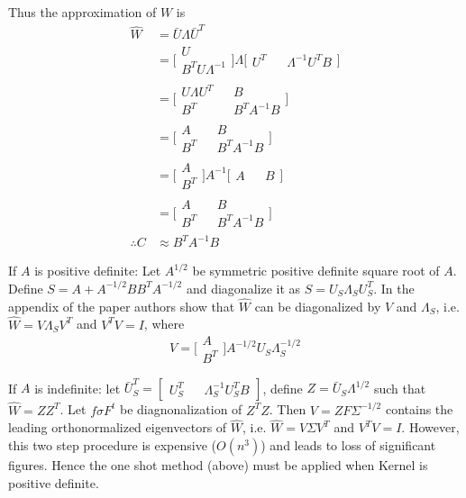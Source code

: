 \documentclass[10pt,a4paper,twoside]{report}
\theoremstyle{definition}
\begin{document}
	Thus the approximation of $W$ is 
	\begin{align*}
			\hat{W} &= \bar{U}\Lambda\bar{U}^T \\
			&= \bigg[\begin{matrix}	U\\B^TU\Lambda^{-1}	\end{matrix}\bigg]\Lambda\bigg[\begin{matrix}U^T && \Lambda^{-1}U^TB\end{matrix}\bigg] \\
			&= \bigg[\begin{matrix} U\Lambda U^T && B\\B^T && B^TA^{-1}B \end{matrix}\bigg] \\
			&= \bigg[\begin{matrix} A && B \\B^T && B^TA^{-1}B \end{matrix}\bigg]\\
			&= \bigg[\begin{matrix} A\\B^T \end{matrix}\bigg] A^{-1} \bigg[\begin{matrix}A&&B\end{matrix}\bigg]\\
			&= \bigg[\begin{matrix}	A && B\\B^T && B^TA^{-1}B \end{matrix}\bigg]\\
			\therefore C &\approx B^TA^{-1}B
	\end{align*}
	
	If $A$ is positive definite: Let $A^{1/2}$ be symmetric positive definite square root of $A$. Define $S=A+A^{-1/2}BB^TA^{-1/2}$ and diagonalize it as $S=U_S\Lambda_SU^T_S$. In the appendix of the paper authors show that $\hat{W}$ can be diagonalized by $V$ and $\Lambda_S$, i.e. $\hat{W}=V\Lambda_SV^T$ and $V^TV=I$, where $$V=\bigg[\begin{matrix}A\\B^T\end{matrix}\bigg]A^{-1/2}U_S\Lambda^{-1/2}_S$$
	
	If $A$ is indefinite: let $\bar{U}^T_S=[\begin{matrix}U^T_S&&\Lambda_S^{-1}U^T_SB\end{matrix}]$, define $Z=\bar{U}_S \Lambda^{1/2}$ such that $\hat{W}=ZZ^T$. Let $f\sigma F^t$ be diagnonalization of $Z^TZ$. Then $V=ZF\Sigma^{-1/2}$ contains the leading orthonormalized eigenvectors of $\hat{W}$, i.e. $\hat{W}=V\Sigma V^T$ and $V^TV=I$. However, this two step procedure is expensive ($O(n^3)$) and leads to loss of significant figures. Hence the one shot method (above) must be applied when Kernel is positive definite.
	
\end{document}
